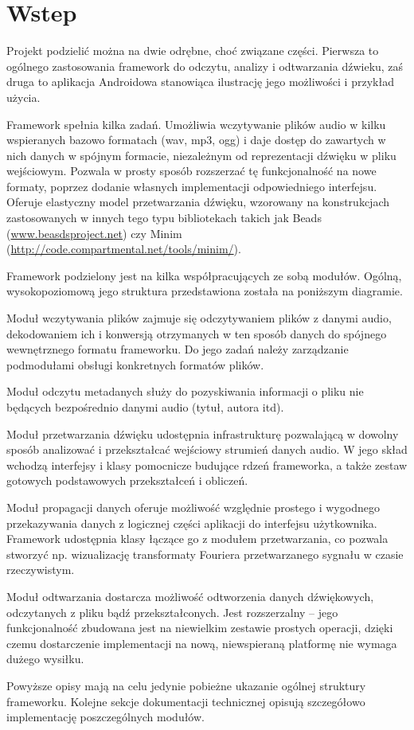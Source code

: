 
\chapter{Wstep}

Projekt podzielić można na dwie odrębne, choć związane części. Pierwsza to ogólnego zastosowania
framework do odczytu, analizy i odtwarzania dźwieku, zaś druga to aplikacja Androidowa stanowiąca
ilustrację jego możliwości i przykład użycia.

Framework spełnia kilka zadań. Umożliwia wczytywanie plików audio w kilku wspieranych bazowo
formatach (wav, mp3, ogg) i daje dostęp do zawartych w nich danych w spójnym formacie, niezależnym
od reprezentacji dźwięku w pliku wejściowym. Pozwala w prosty sposób rozszerzać tę funkcjonalność na
nowe formaty, poprzez dodanie własnych implementacji odpowiedniego interfejsu. Oferuje elastyczny
model przetwarzania dźwięku, wzorowany na konstrukcjach zastosowanych w innych tego typu
bibliotekach takich jak Beads (\url{www.beasdsproject.net}) czy Minim
(\url{http://code.compartmental.net/tools/minim/}).

Framework podzielony jest na kilka współpracujących ze sobą modułów. Ogólną, wysokopoziomową jego
struktura przedstawiona została na poniższym diagramie.


Moduł wczytywania plików zajmuje się odczytywaniem plików z danymi audio, dekodowaniem ich i
konwersją otrzymanych w ten sposób danych do spójnego wewnętrznego formatu frameworku. Do jego zadań
należy zarządzanie podmodułami obsługi konkretnych formatów plików.

Moduł odczytu metadanych służy do pozyskiwania informacji o pliku nie będących bezpośrednio danymi
audio (tytuł, autora itd). 

Moduł przetwarzania dźwięku udostępnia infrastrukturę pozwalającą w dowolny sposób analizować i
przekształcać wejściowy strumień danych audio. W jego skład wchodzą interfejsy i klasy pomocnicze
budujące rdzeń frameworka, a także zestaw gotowych podstawowych przekształceń i obliczeń.

Moduł propagacji danych oferuje możliwość względnie prostego i wygodnego przekazywania danych z
logicznej części aplikacji do interfejsu użytkownika. Framework udostępnia klasy łączące go z
modułem przetwarzania, co pozwala stworzyć np. wizualizację transformaty Fouriera przetwarzanego
sygnału w czasie rzeczywistym.

Moduł odtwarzania dostarcza możliwość odtworzenia danych dźwiękowych, odczytanych z pliku bądź
przekształconych. Jest rozszerzalny -- jego funkcjonalność zbudowana jest na niewielkim zestawie
prostych operacji, dzięki czemu dostarczenie implementacji na nową, niewspieraną platformę nie
wymaga dużego wysiłku.

Powyższe opisy mają na celu jedynie pobieżne ukazanie ogólnej struktury frameworku. Kolejne sekcje
dokumentacji technicznej opisują szczegółowo implementację poszczególnych modułów.
